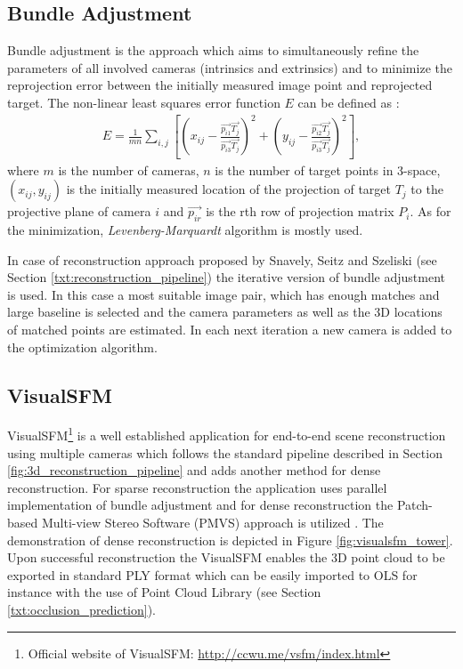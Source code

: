 \subsection{Bundle Adjustment} \label{txt:bundle_adjustment}

Bundle adjustment is the approach which aims to simultaneously refine the parameters of all involved cameras (intrinsics and extrinsics) and to minimize the reprojection error between the initially measured image point and reprojected target. The non-linear least squares error function $E$ can be defined as \cite{Forsyth:2002:CVM:580035}:
\begin{align}
	E = \frac{1}{mn}\sum_{i,j}{[(x_{ij} - \frac{\vec{p_{i1}}\vec{T_{j}}}{\vec{p_{i3}}\vec{T_{j}}})^{2} + (y_{ij} - \frac{\vec{p_{i2}}\vec{T_{j}}}{\vec{p_{i3}}\vec{T_{j}}})^{2}]},
\end{align}
where $m$ is the number of cameras, $n$ is the number of target points in 3-space, $(x_{ij}, y_{ij})$ is the initially measured location of the projection of target $T_{j}$ to the projective plane of camera $i$ and $\vec{p_{ir}}$ is the rth row of projection matrix $P_{i}$. As for the minimization, \textit{Levenberg-Marquardt} algorithm is mostly used. 

In case of reconstruction approach proposed by Snavely, Seitz and Szeliski \cite{Snavely:2006:PTE:1179352.1141964} (see Section \ref{txt:reconstruction_pipeline}) the iterative version of bundle adjustment is used. In this case a most suitable image pair, which has enough matches and large baseline is selected and the camera parameters as well as the 3D locations of matched points are estimated. In each next iteration a new camera is added to the optimization algorithm.

\subsection{VisualSFM}

VisualSFM\footnote{Official website of VisualSFM: \url{http://ccwu.me/vsfm/index.html}} is a well established application for end-to-end scene reconstruction using multiple cameras which follows the standard pipeline described in Section \ref{fig:3d_reconstruction_pipeline} and adds another method for dense reconstruction. For sparse reconstruction the application uses parallel implementation of bundle adjustment \cite{ChangchangWu:2011:MBA:2191740.2191945} and for dense reconstruction the Patch-based Multi-view Stereo Software (PMVS) approach is utilized \cite{Furu:2010:PMVS}. The demonstration of dense reconstruction is depicted in Figure \ref{fig:visualsfm_tower}. Upon successful reconstruction the VisualSFM enables the 3D point cloud to be exported in standard PLY format which can be easily imported to OLS for instance with the use of Point Cloud Library (see Section \ref{txt:occlusion_prediction}).


